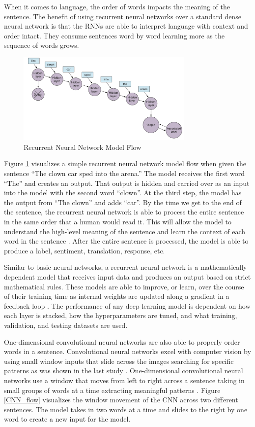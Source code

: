 \documentclass[5p,authoryear]{elsarticle}
\begin{document}
When it comes to language, the order of words impacts the meaning of the sentence. The benefit of using recurrent neural networks over a standard dense neural network is that the RNNs are able to interpret language with context and order intact. They consume sentences word by word learning more as the sequence of words grows.


\begin{figure}[!h] 
    \centering
	\includegraphics[width=3.4in]{figures/RNN_Flow.png}
	\caption[]{Recurrent Neural Network Model Flow} 
	\label{RNN_flow} 
\end{figure}

Figure \ref{RNN_flow} visualizes a simple recurrent neural network model flow when given the sentence “The clown car sped into the arena.” The model receives the first word “The” and creates an output. That output is hidden and carried over as an input into the model with the second word “clown”. At the third step, the model has the output from “The clown” and adds “car”. By the time we get to the end of the sentence, the recurrent neural network is able to process the entire sentence in the same order that a human would read it. This will allow the model to understand the high-level meaning of the sentence and learn the context of each word in the sentence \citep{chollet}. After the entire sentence is processed, the model is able to produce a label, sentiment, translation, response, etc. 

Similar to basic neural networks, a recurrent neural network is a mathematically dependent model that receives input data and produces an output based on strict mathematical rules. These models are able to improve, or learn, over the course of their training time as internal weights are updated along a gradient in a feedback loop \citep{lane}. The performance of any deep learning model is dependent on how each layer is stacked, how the hyperparameters are tuned, and what training, validation, and testing datasets are used. 

One-dimensional convolutional neural networks are also able to properly order words in a sentence. Convolutional neural networks excel with computer vision by using small window inputs that slide across the images searching for specific patterns as was shown in the last study \citep{lee}. One-dimensional convolutional neural networks use a window that moves from left to right across a sentence taking in small groups of words at a time extracting meaningful patterns \citep{chollet}. Figure \ref{CNN_flow} visualizes the window movement of the CNN across two different sentences. The model takes in two words at a time and slides to the right by one word to create a new input for the model.
\end{document}
